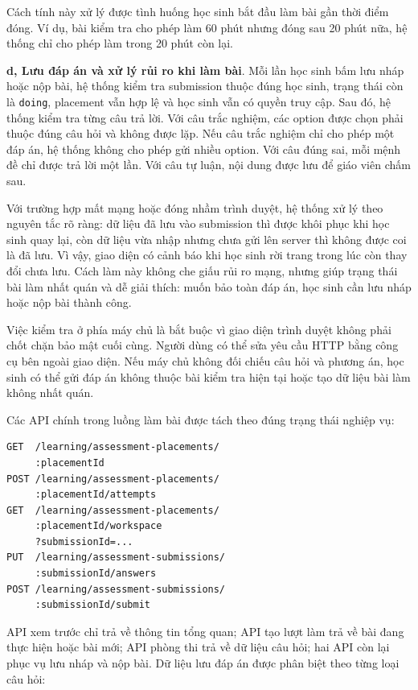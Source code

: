 \documentclass[../DoAn.tex]{subfiles}
\begin{document}
Cách tính này xử lý được tình huống học sinh bắt đầu làm bài gần thời điểm đóng. Ví dụ, bài kiểm tra cho phép làm 60 phút nhưng đóng sau 20 phút nữa, hệ thống chỉ cho phép làm trong 20 phút còn lại.

\textbf{d, Lưu đáp án và xử lý rủi ro khi làm bài}. Mỗi lần học sinh bấm lưu nháp hoặc nộp bài, hệ thống kiểm tra submission thuộc đúng học sinh, trạng thái còn là \texttt{doing}, placement vẫn hợp lệ và học sinh vẫn có quyền truy cập. Sau đó, hệ thống kiểm tra từng câu trả lời. Với câu trắc nghiệm, các option được chọn phải thuộc đúng câu hỏi và không được lặp. Nếu câu trắc nghiệm chỉ cho phép một đáp án, hệ thống không cho phép gửi nhiều option. Với câu đúng sai, mỗi mệnh đề chỉ được trả lời một lần. Với câu tự luận, nội dung được lưu để giáo viên chấm sau.

Với trường hợp mất mạng hoặc đóng nhầm trình duyệt, hệ thống xử lý theo nguyên tắc rõ ràng: dữ liệu đã lưu vào submission thì được khôi phục khi học sinh quay lại, còn dữ liệu vừa nhập nhưng chưa gửi lên server thì không được coi là đã lưu. Vì vậy, giao diện có cảnh báo khi học sinh rời trang trong lúc còn thay đổi chưa lưu. Cách làm này không che giấu rủi ro mạng, nhưng giúp trạng thái bài làm nhất quán và dễ giải thích: muốn bảo toàn đáp án, học sinh cần lưu nháp hoặc nộp bài thành công.

Việc kiểm tra ở phía máy chủ là bắt buộc vì giao diện trình duyệt không phải chốt chặn bảo mật cuối cùng. Người dùng có thể sửa yêu cầu HTTP bằng công cụ bên ngoài giao diện. Nếu máy chủ không đối chiếu câu hỏi và phương án, học sinh có thể gửi đáp án không thuộc bài kiểm tra hiện tại hoặc tạo dữ liệu bài làm không nhất quán.

Các API chính trong luồng làm bài được tách theo đúng trạng thái nghiệp vụ:

\begin{verbatim}
GET  /learning/assessment-placements/
     :placementId
POST /learning/assessment-placements/
     :placementId/attempts
GET  /learning/assessment-placements/
     :placementId/workspace
     ?submissionId=...
PUT  /learning/assessment-submissions/
     :submissionId/answers
POST /learning/assessment-submissions/
     :submissionId/submit
\end{verbatim}

API xem trước chỉ trả về thông tin tổng quan; API tạo lượt làm trả về bài đang thực hiện hoặc bài mới; API phòng thi trả về dữ liệu câu hỏi; hai API còn lại phục vụ lưu nháp và nộp bài. Dữ liệu lưu đáp án được phân biệt theo từng loại câu hỏi:
\end{document}
